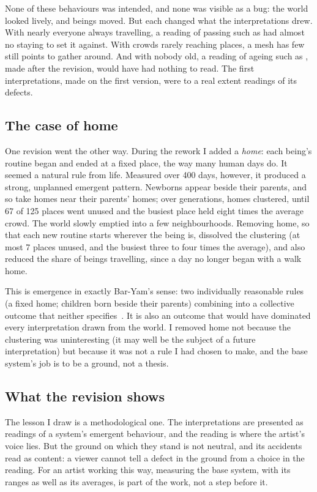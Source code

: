 None of these behaviours was intended, and none was visible as a bug: the world looked lively, and beings moved. But each changed what the interpretations drew. With nearly everyone always travelling, a reading of passing such as  had almost no staying to set it against. With crowds rarely reaching places, a mesh has few still points to gather around. And with nobody old, a reading of ageing such as , made after the revision, would have had nothing to read. The first interpretations, made on the first version, were to a real extent readings of its defects.

\subsection{The case of home}

One revision went the other way. During the rework I added a \emph{home}: each being's routine began and ended at a fixed place, the way many human days do. It seemed a natural rule from life. Measured over 400 days, however, it produced a strong, unplanned emergent pattern. Newborns appear beside their parents, and so take homes near their parents' homes; over generations, homes clustered, until 67 of 125 places went unused and the busiest place held eight times the average crowd. The world slowly emptied into a few neighbourhoods. Removing home, so that each new routine starts wherever the being is, dissolved the clustering (at most 7 places unused, and the busiest three to four times the average), and also reduced the share of beings travelling, since a day no longer began with a walk home.

This is emergence in exactly Bar-Yam's sense: two individually reasonable rules (a fixed home; children born beside their parents) combining into a collective outcome that neither specifies~\cite{baryam1997}. It is also an outcome that would have dominated every interpretation drawn from the world. I removed home not because the clustering was uninteresting (it may well be the subject of a future interpretation) but because it was not a rule I had chosen to make, and the base system's job is to be a ground, not a thesis.

\subsection{What the revision shows}

The lesson I draw is a methodological one. The interpretations are presented as readings of a system's emergent behaviour, and the reading is where the artist's voice lies. But the ground on which they stand is not neutral, and its accidents read as content: a viewer cannot tell a defect in the ground from a choice in the reading. For an artist working this way, measuring the base system, with its ranges as well as its averages, is part of the work, not a step before it.
